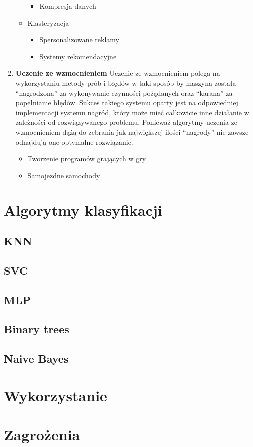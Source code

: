 \begin{enumerate}
\begin{itemize}
\begin{itemize}
            \item Kompresja danych
        \end{itemize}
        \item Klasteryzacja
        \begin{itemize}
            \item Spersonalizowane reklamy
            \item Systemy rekomendacyjne
        \end{itemize}
    \end{itemize}
    \item \textbf{Uczenie ze wzmocnieniem}
    Uczenie ze wzmocnieniem polega na wykorzystaniu metody prób i błędów w taki sposób by maszyna została
    ``nagrodzona'' za wykonywanie czynności pożądanych oraz ``karana'' za popełnianie błędów. 
    Sukces takiego systemu oparty jest na odpowiedniej implementacji systemu nagród, który może 
    mieć całkowicie inne działanie w zależności od rozwiązywanego problemu. 
    Ponieważ algorytmy uczenia ze wzmocnieniem dążą do zebrania jak największej
    ilości ``nagrody'' nie zawsze odnajdują one optymalne rozwiązanie.
    \begin{itemize}
        \item Tworzenie programów grających w gry
        \item Samojezdne samochody
    \end{itemize}
\end{enumerate} 

\section{Algorytmy klasyfikacji}

\subsection{KNN}
\subsection{SVC}
\subsection{MLP}
\subsection{Binary trees}
\subsection{Naive Bayes}

\section{Wykorzystanie}

\section{Zagrożenia}
